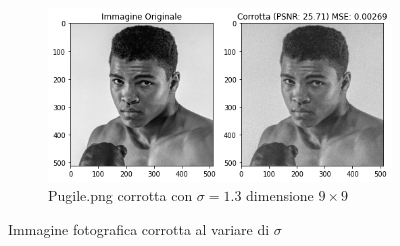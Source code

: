 \begin{figure}[H]
    \begin{subfigure}{0.6\textwidth}
        \centering
        \includegraphics[width=\textwidth]{imgRel/muhammedcorrotto/muhammedcorrotto5x5.png}
        \caption{Pugile.png corrotta con $\sigma = 1.3$ dimensione $9 \times 9$}
        \label{fig: pugilecorrotto9}
    \end{subfigure}
    \caption{Immagine fotografica corrotta al variare di $\sigma$}
    \label{fig: PugileCorrotto}
\end{figure}


